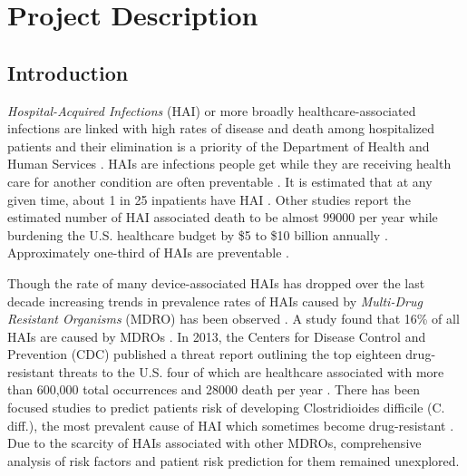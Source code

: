 \section{Project Description}
\subsection{Introduction}
\emph{Hospital-Acquired Infections} (HAI) or more broadly healthcare-associated infections are linked with high rates of disease and death among hospitalized patients \cite{cdc} and their elimination is a priority of the Department of Health and Human Services \cite{hhs}. HAIs are infections people get while they are receiving health care for another condition are often preventable \cite{progress}. It is estimated that at any given time, about 1 in 25 inpatients have HAI \cite{magill2014multistate, hhs}. Other studies report the estimated number of HAI associated death to be almost 99000 per year \cite{klevens2007estimating} while burdening the U.S. healthcare budget by \$5 to \$10 billion annually \cite{stone2005economic}. Approximately one-third of HAIs are preventable \cite{yokoe2014compendium}.



Though the rate of many device-associated HAIs has dropped over the last decade \cite{progress} increasing trends in prevalence rates of HAIs caused by \emph{Multi-Drug Resistant Organisms} (MDRO) has been observed \cite{balkhair2014epidemiology, actionplan}. A study found that 16\% of all HAIs are caused by MDROs \cite{hidron2008antimicrobial}. In 2013, the Centers for Disease Control and Prevention (CDC) published a threat report outlining the top eighteen drug-resistant threats to the U.S. four of which are healthcare associated with more than 600,000 total occurrences and 28000 death per year \cite{resistance}. There has been focused studies to predict patients risk of developing Clostridioides difficile (C. diff.), the most prevalent cause of HAI which sometimes become drug-resistant \cite{oh2018generalizable, wiens2012learning, wiens2014learning, wiens2012patient}. Due to the scarcity of HAIs associated with other MDROs, comprehensive analysis of risk factors and patient risk prediction for them remained unexplored.



